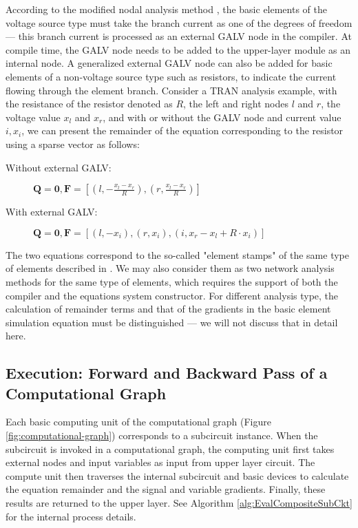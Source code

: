 According to the modified nodal analysis method \cite{ho1975modified}, the basic elements of the voltage source type must take the branch current as one of the degrees of freedom --- this branch current is processed as an external GALV node in the compiler. At compile time, the GALV node needs to be added to the upper-layer module as an internal node. A generalized external GALV node can also be added for basic elements of a non-voltage source type such as resistors, to indicate the current flowing through the element branch. Consider a TRAN analysis example, with the resistance of the resistor denoted as $R$, the left and right nodes $l$ and $r$, the voltage value $x_l$ and $x_r$, and with or without the GALV node and current value $i,x_i$, we can present the remainder of the equation corresponding to the resistor using a sparse vector as follows:
\begin{description}
\item[Without external GALV:] $\bm{Q}=\bm{0},\bm{F}=[(l,-\frac{x_l-x_r}{R}),(r,\frac{x_l-x_r}{R})]$
\item[With external GALV:] $\bm{Q}=\bm{0},\bm{F}=[(l,-x_i),(r,x_i),(i,x_r-x_l+R\cdot x_i)]$
\end{description}
The two equations correspond to the so-called "element stamps" of the same type of elements described in \cite[Section 2.4.4]{najm2010circuit}. We may also consider them as two network analysis methods \cite{ho1975modified,hachtel1971sparse} for the same type of elements, which requires the support of both the compiler and the equations system constructor. For different analysis type, the calculation of remainder terms and that of the gradients in the basic element simulation equation must be distinguished --- we will not discuss that in detail here.

\subsection{Execution: Forward and Backward Pass of a Computational Graph}\label{subsec:EvalCompositeSubCkt}
Each basic computing unit of the computational graph (Figure \ref{fig:computational-graph}) corresponds to a subcircuit instance. When the subcircuit is invoked in a computational graph, the computing unit first takes external nodes and input variables as input from upper layer circuit. The compute unit then traverses the internal subcircuit and basic devices to calculate the equation remainder and the signal and variable gradients. Finally, these results are returned to the upper layer. See Algorithm \ref{alg:EvalCompositeSubCkt} for the internal process details.

